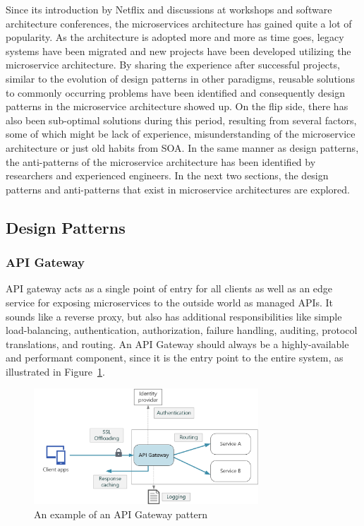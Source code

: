 \documentclass{Configuration_Files/PoliMi3i_thesis}
\begin{document}
Since its introduction by Netflix and discussions at workshops and software architecture conferences, the microservices architecture has gained quite a lot of popularity.
As the architecture is adopted more and more as time goes, legacy systems have been migrated and new projects have been developed utilizing the microservice architecture.
By sharing the experience after successful projects, similar to the evolution of design patterns in other paradigms, reusable solutions to commonly occurring problems have been identified and consequently design patterns in the microservice architecture showed up.
On the flip side, there has also been sub-optimal solutions during this period, resulting from several factors, some of which might be lack of experience, misunderstanding of the microservice architecture or just old habits from SOA.
In the same manner as design patterns, the anti-patterns of the microservice architecture has been identified by researchers and experienced engineers.
In the next two sections, the design patterns and anti-patterns that exist in microservice architectures are explored.

\subsection{Design Patterns}
\label{subsec:designpattern}

\subsubsection{API Gateway}
\label{subsubsec:api_gateway}

API gateway acts as a single point of entry for all clients as well as an edge service for exposing microservices to the outside world as managed APIs.
It sounds like a reverse proxy, but also has additional responsibilities like simple load-balancing, authentication, authorization, failure handling, auditing, protocol translations, and routing. An API Gateway should always be a highly-available and performant component, since it is the entry point to the entire system, as illustrated in Figure~\ref{fig:api_gateway}.

\begin{figure}[H]
    \centering
    \includegraphics[width=0.75\textwidth]{myImages/api_gateway.png}
    \caption{An example of an API Gateway pattern}
    \label{fig:api_gateway}
\end{figure}
\end{document}

